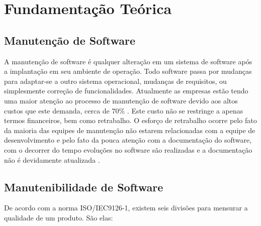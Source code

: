 \chapter{Fundamentação Teórica}\label{fundamentacao}

\section{Manutenção de Software}\label{manutencao}
A manutenção de software é qualquer alteração em um sistema de software após a implantação em seu ambiente de operação. Todo software passa por mudanças para adaptar-se a outro sistema operacional, mudanças de requisitos, ou simplesmente correção de funcionalidades. Atualmente as empresas estão tendo uma maior atenção ao processo de manutenção de software devido aos altos custos que este demanda, cerca de 70\% \cite{pressman2010} \cite{pigoski1997}. Este custo não se restringe a apenas termos financeiros, bem como retrabalho. O esforço de retrabalho ocorre pelo fato da maioria das equipes de manutenção não estarem relacionadas com a equipe de desenvolvimento e pelo fato da pouca atenção com a documentação do software, com o decorrer do tempo evoluções no software são realizadas e a documentação não é devidamente atualizada \cite{sergio2005}.

\section{Manutenibilidade de Software}
De acordo com a norma ISO/IEC9126-1, existem seis divisões para mensurar a qualidade de um produto. São elas:

